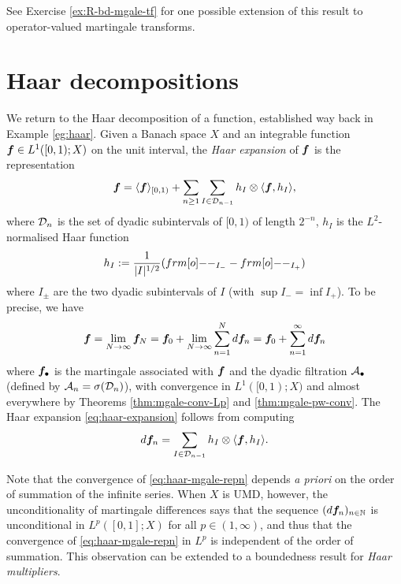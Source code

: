 See Exercise \ref{ex:R-bd-mgale-tf} for one possible extension of this result to operator-valued martingale transforms.

\section{Haar decompositions}

We return to the Haar decomposition of a function, established way back in Example \ref{eg:haar}.
Given a Banach space $X$ and an integrable function $\bm{f} \in L^1([0,1);X)$ on the unit interval, the \emph{Haar expansion} of $\bm{f}$ is the representation
\begin{equation}\label{eq:haar-expansion}
  \bm{f} = \langle \bm{f} \rangle_{[0,1)} + \sum_{n \geq 1} \sum_{I \in \mathcal{D}_{n-1}} h_{I} \otimes \langle \bm{f}, h_{I} \rangle,
\end{equation}
where $\mathcal{D}_{n}$ is the set of dyadic subintervals of $[0,1)$ of length $2^{-n}$, $h_{I}$ is the $L^2$-normalised Haar function
\begin{equation*}
  h_{I} := \frac{1}{|I|^{1/2}} (\1_{I_{-}} - \1_{I_{+}})
\end{equation*}
where $I_{\pm}$ are the two dyadic subintervals of $I$ (with $\sup I_{-} = \inf I_{+}$).
To be precise, we have
\begin{equation}\label{eq:haar-mgale-repn}
  \bm{f} = \lim_{N \to \infty} \bm{f}_{N} =  \bm{f}_{0} + \lim_{N \to \infty} \sum_{n = 1}^{N} d\bm{f}_{n}
  = \bm{f}_{0} + \sum_{n = 1}^{\infty} d\bm{f}_{n}
\end{equation}
where $\bm{f}_{\bullet}$ is the martingale associated with $\bm{f}$ and the dyadic filtration $\mathcal{A}_{\bullet}$ (defined by $\mathcal{A}_{n} = \sigma(\mathcal{D}_{n})$), with convergence in $L^1([0,1);X)$ and almost everywhere by Theorems \ref{thm:mgale-conv-Lp} and \ref{thm:mgale-pw-conv}.
The Haar expansion \eqref{eq:haar-expansion} follows from computing
\begin{equation}\label{eq:haar-difference}
  d\bm{f}_{n} = \sum_{I \in \mathcal{D}_{n-1}} h_{I} \otimes \langle \bm{f}, h_{I} \rangle.
\end{equation}

Note that the convergence of \eqref{eq:haar-mgale-repn} depends \emph{a priori} on the order of summation of the infinite series.
When $X$ is UMD, however, the unconditionality of martingale differences says that the sequence $(d\bm{f}_{n})_{n \in \mathbb{N}}$ is unconditional in $L^p([0,1];X)$ for all $p \in (1,\infty)$, and thus that the convergence of \eqref{eq:haar-mgale-repn} in $L^p$ is independent of the order of summation.
This observation can be extended to a boundedness result for \emph{Haar multipliers}.

